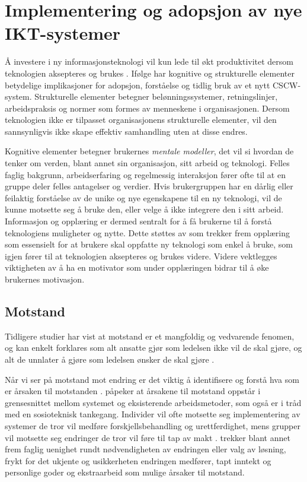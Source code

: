 \section{Implementering og adopsjon av nye IKT-systemer}
\label{sec:implementering}
 
Å investere i ny informasjonsteknologi vil kun lede til økt produktivitet dersom teknologien aksepteres og brukes \citep{Venkatesh99}.
Ifølge \citet{Orlikowski92} har kognitive og strukturelle elementer betydelige implikasjoner for adopsjon, forståelse og tidlig bruk av et nytt CSCW-system. Strukturelle elementer betegner belønningssystemer, retningslinjer, arbeidspraksis og normer som formes av menneskene i organisasjonen. Dersom teknologien ikke er tilpasset organisasjonens strukturelle elementer, vil den sannsynligvis ikke skape effektiv samhandling uten at disse endres.
 
\noindent
Kognitive elementer betegner brukernes \textit{mentale modeller}, det vil si hvordan de tenker om verden, blant annet sin organisasjon, sitt arbeid og teknologi. Felles faglig bakgrunn, arbeidserfaring og regelmessig interaksjon fører ofte til at en gruppe deler felles antagelser og verdier. Hvis brukergruppen har en dårlig eller feilaktig forståelse av de unike og nye egenskapene til en ny teknologi, vil de kunne motsette seg å bruke den, eller velge å ikke integrere den i sitt arbeid. Informasjon og opplæring er dermed sentralt for å få brukerne til å forstå teknologiens muligheter og nytte. Dette støttes av \citet{Venkatesh99} som trekker frem opplæring som essensielt for at brukere skal oppfatte ny teknologi som enkel å bruke, som igjen fører til at teknologien aksepteres og brukes videre. Videre vektlegges viktigheten av å ha en motivator som under opplæringen bidrar til å øke brukernes motivasjon.
 
\subsection{Motstand}
\label{sec:motstand}
Tidligere studier har vist at motstand er et mangfoldig og vedvarende fenomen, og kan enkelt forklares som alt ansatte gjør som ledelsen ikke vil de skal gjøre, og alt de unnlater å gjøre som ledelsen ønsker de skal gjøre \citep{Timmons03}.
 
\noindent
Når vi ser på motstand mot endring er det viktig å identifisere og forstå hva som er årsaken til motstanden \citep{Lapointe05}. \citet{Timmons03} påpeker at årsakene til motstand oppstår i grensesnittet mellom systemet og eksisterende arbeidsmetoder, som også er i tråd med en sosioteknisk tankegang. Individer vil ofte motsette seg implementering av systemer de tror vil medføre forskjellsbehandling og urettferdighet, mens grupper vil motsette seg endringer de tror vil føre til tap av makt \citep{Lapointe05}. \citet{Jacobsen12} trekker blant annet frem faglig uenighet rundt nødvendigheten av endringen eller valg av løsning, frykt for det ukjente og usikkerheten endringen medfører, tapt inntekt og personlige goder og ekstraarbeid som mulige årsaker til motstand.
 
